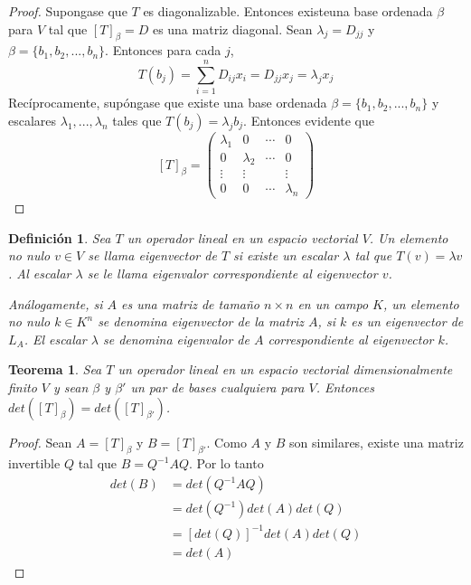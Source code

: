 \documentclass{book}
\newtheorem{theorem}{Teorema}
\newtheorem{definition}{Definición}
\begin{document}
\begin{proof}
Supongase que $T$ es diagonalizable. Entonces existeuna base ordenada $\beta$ para $V$ tal que $[T]_{\beta}=D$ es una matriz diagonal. Sean $\lambda_{j}=D_{jj}$ y $\beta=\{b_1,b_2,...,b_n\}$. Entonces para cada $j$,
\[
T(b_{j})=\sum_{i=1}^{n}D_{ij}x_{i}=D_{jj}x_{j}=\lambda_{j}x_{j}
\]
Recíprocamente, supóngase que existe una base ordenada $\beta=\{b_1,b_2,...,b_n\}$ y escalares $\lambda_{1},...,\lambda_{n}$ tales que $T(b_j)=\lambda_j b_j$. Entonces evidente que 
\[
[T]_{\beta}=
\begin{pmatrix}
\lambda_1 & 0 & \cdots & 0\\
0 & \lambda_2 & \cdots & 0\\
\vdots & \vdots &   & \vdots\\
0 & 0 & \cdots & \lambda_{n}
\end{pmatrix}
\]
\end{proof}

\begin{definition}
Sea $T$ un operador lineal en un espacio vectorial $V$. Un elemento no nulo $v \in V$ se llama eigenvector de $T$ si existe un escalar $\lambda$ tal que $T(v)=\lambda v$. Al escalar $\lambda$ se le llama eigenvalor correspondiente al eigenvector $v$.

Análogamente, si $A$ es una matriz de tamaño $n\times n$ en un campo $K$, un elemento no nulo $k\in K^{n}$ se denomina eigenvector de la matriz $A$, si $k$ es un eigenvector de $L_{A}$. El escalar $\lambda$ se denomina eigenvalor de $A$ correspondiente al eigenvector $k$.
\end{definition}

\begin{theorem}
Sea $T$ un operador lineal en un espacio vectorial dimensionalmente finito $V$ y sean $\beta$ y $\beta '$ un par de bases cualquiera para $V$. Entonces $det([T]_{\beta})=det([T]_{\beta '})$.
\end{theorem}

\begin{proof}
Sean $A=[T]_{\beta}$ y $B=[T]_{\beta '}$. Como $A$ y $B$ son similares, existe una matriz invertible $Q$ tal que $B=Q^{-1}AQ$. Por lo tanto
\[
\begin{split}
det(B) &= det(Q^{-1}AQ) \\
&= det(Q^{-1})det(A)det(Q) \\
&= [det(Q)]^{-1}det(A)det(Q) \\
&= det(A)
\end{split}
\]
\end{proof}
\end{document}
